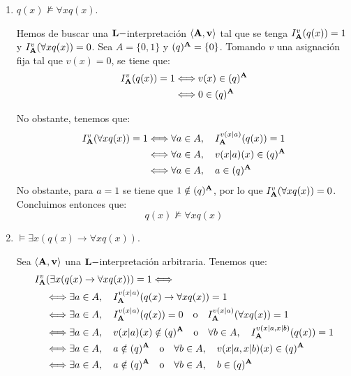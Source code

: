 \begin{ejercicio}
\begin{enumerate}
        \item $q(x)\nvDash \forall x q(x)$.
        
        Hemos de buscar una $\bf{L}-$interpretación $\langle \bf{A},v\rangle$ tal que se tenga $I_{\bf{A}}^v(q(x))=1$ y $I_{\bf{A}}^v(\forall x q(x))=0$.
        Sea $A=\{0,1\}$ y $(q)^{\bf{A}}=\{0\}$. Tomando $v$ una asignación fija tal que $v(x)=0$, se tiene que:
        \begin{align*}
            I_{\bf{A}}^v(q(x)) = 1
            & \Longleftrightarrow v(x)\in (q)^{\bf{A}}\\
            & \Longleftrightarrow 0\in (q)^{\bf{A}}
        \end{align*}

        No obstante, tenemos que:
        \begin{align*}
            I_{\bf{A}}^v(\forall x q(x)) = 1
            & \Longleftrightarrow \forall a\in A,\quad  I_{\bf{A}}^{v(x|a)}(q(x))=1\\
            & \Longleftrightarrow \forall a\in A,\quad  v(x|a)(x)\in (q)^{\bf{A}}\\
            & \Longleftrightarrow \forall a\in A,\quad  a\in (q)^{\bf{A}}
        \end{align*}
        No obstante, para $a=1$ se tiene que $1\notin (q)^{\bf{A}}$, por lo que $I_{\bf{A}}^v(\forall x q(x))=0$.
        Concluimos entonces que:
        \[q(x)\nvDash \forall x q(x)\]

        \item $\vDash \exists x(q(x)\rightarrow \forall x q(x))$.
        
        Sea $\langle \bf{A},v\rangle$ una $\bf{L}-$interpretación arbitraria. Tenemos que:
        \begin{align*}
            I_{\bf{A}}^v&(\exists x(q(x)\rightarrow \forall x q(x))) = 1 \Longleftrightarrow \\
            & \Longleftrightarrow \exists a\in A,\quad  I_{\bf{A}}^{v(x|a)}(q(x)\rightarrow \forall x q(x))=1\\
            & \Longleftrightarrow \exists a\in A,\quad  I_{\bf{A}}^{v(x|a)}(q(x))=0 \quad\text{o}\quad I_{\bf{A}}^{v(x|a)}(\forall x q(x))=1\\
            & \Longleftrightarrow \exists a\in A,\quad  v(x|a)(x)\notin (q)^{\bf{A}} \quad\text{o}\quad \forall b\in A,\quad I_{\bf{A}}^{v(x|a,x|b)}(q(x))=1\\
            & \Longleftrightarrow \exists a\in A,\quad  a\notin (q)^{\bf{A}} \quad\text{o}\quad \forall b\in A,\quad v(x|a,x|b)(x)\in (q)^{\bf{A}} \\
            & \Longleftrightarrow \exists a\in A,\quad  a\notin (q)^{\bf{A}} \quad\text{o}\quad \forall b\in A,\quad b\in (q)^{\bf{A}}
        \end{align*}


\end{enumerate}
\end{ejercicio}
